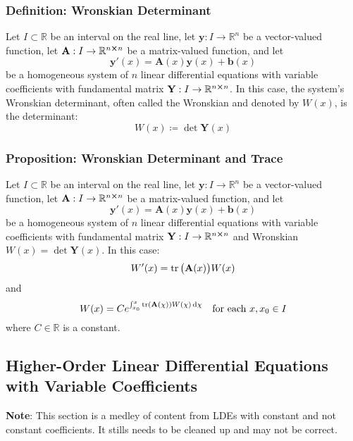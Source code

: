 \documentclass[11pt, a4paper]{article}
\newcommand{\diff}{\mathop{}\!\mathrm{d}} %
\newcommand{\R}{\mathbb{R}} %
\begin{document}
\subsubsection{Definition: Wronskian Determinant}
Let $ I \subset \R $ be an interval on the real line, let $ \bm{y}: I \to \R^n $ be a vector-valued function, let $ \mathbf{A} : I \to \R^{n \cross n} $ be a matrix-valued function, and let
\begin{equation*}
	\bm{y}'(x) = \mathbf{A}(x) \bm{y}(x) + \bm{b}(x)
\end{equation*}
be a homogeneous system of $ n $ linear differential equations with variable coefficients with fundamental matrix $ \mathbf{Y}: I \to \R^{n \cross n} $. In this case, the system's Wronskian determinant, often called the Wronskian and denoted by $ W(x) $, is the determinant:
\begin{equation*}
	W (x) \coloneqq \det\mathbf{Y}(x)
\end{equation*}

\subsubsection{Proposition: Wronskian Determinant and Trace}
Let $ I \subset \R $ be an interval on the real line, let $ \bm{y}: I \to \R^n $ be a vector-valued function, let $ \mathbf{A} : I \to \R^{n \cross n} $ be a matrix-valued function, and let
\begin{equation*}
	\bm{y}'(x) = \mathbf{A}(x) \bm{y}(x) + \bm{b}(x)
\end{equation*}
be a homogeneous system of $ n $ linear differential equations with variable coefficients with fundamental matrix $ \mathbf{Y}: I \to \R^{n \cross n} $ and Wronskian $ W(x) = \det \mathbf{Y}(x) $. In this case:
\begin{equation*}
	W'(x) = \tr \big (\mathbf{A}(x) \big)W(x)
\end{equation*}
and
\begin{equation*}
	W(x) = C e^{\int_{x_0}^{x} \tr (\mathbf{A}(\chi) )W(\chi) \diff \chi} \quad \text{for each } x, x_0 \in I
\end{equation*}
where $ C \in \R $ is a constant.

\subsection{Higher-Order Linear Differential Equations with Variable Coefficients}
\textbf{Note}: This section is a medley of content from LDEs with constant and not constant coefficients. It stills needs to be cleaned up and may not be correct.
\end{document}
